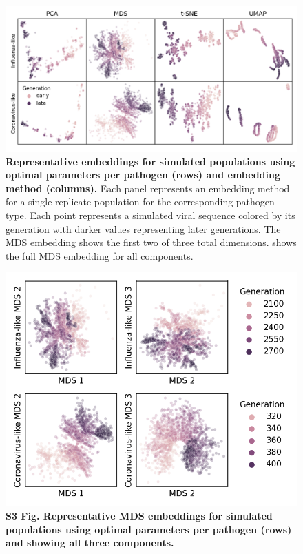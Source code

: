 \documentclass[10pt,letterpaper]{article}
\begin{document}
\begin{figure}[!h]
\includegraphics[width=\columnwidth]{figures/simulated-populations-representative-embeddings.png}
\caption{{\bf Representative embeddings for simulated populations using optimal parameters per pathogen (rows) and embedding method (columns).}
  Each panel represents an embedding method for a single replicate population for the corresponding pathogen type.
  Each point represents a simulated viral sequence colored by its generation with darker values representing later generations.
  The MDS embedding shows the first two of three total dimensions.
   shows the full MDS embedding for all components.}
\label{fig:simulated-populations-representative-embeddings}
\end{figure}

\begin{figure}[!h]
\includegraphics[width=\columnwidth]{figures/simulated-populations-representative-mds-embeddings.png}
\caption*{{\bf S3 Fig. Representative MDS embeddings for simulated populations using optimal parameters per pathogen (rows) and showing all three components.}}
\end{figure}
\end{document}
